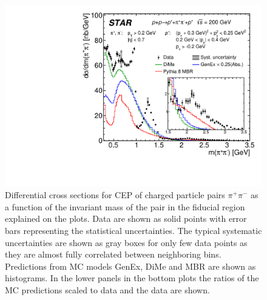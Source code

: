\begin{figure}[h]
\centering
\includegraphics[width=.7\textwidth,page=1]{graphics/physicsResults/FinalResult_InvMass_pion.pdf}
%
\caption[Differential cross sections for CEP of charged particle pairs $\pi^+\pi^-$ as a function of the invariant mass of the pair in the fiducial region.]{Differential cross sections for CEP of charged particle pairs $\pi^+\pi^-$ as a function of the invariant mass of the pair in the fiducial region explained on the plots. Data are shown as solid points with error bars representing the statistical uncertainties. The typical systematic uncertainties are shown as gray boxes for only few data points as they are almost fully correlated between neighboring bins. Predictions from MC models GenEx, DiMe and MBR are shown as histograms. In the lower panels in the bottom plots the ratios of the MC predictions scaled to data and the data are shown.}
\label{results_01}
\end{figure}
%

